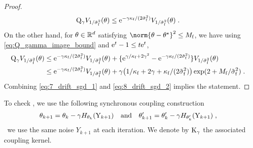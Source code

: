 \begin{proof}
\begin{equation}
{\rm Q}_{\gamma} V_{1/\tilde{\sigma}_{\mathrm{f}}^2}(\theta) \leq \mathrm{e}^{-\gamma\kappa_{\mathrm{f}}/(2\tilde{\sigma}_{\mathrm{f}}^2)} V_{1/\tilde{\sigma}_{\mathrm{f}}^2}(\theta) \;.
\end{equation}
On the other hand, for $\theta \in \mathbb{R}^d$ satisfying $\norm{\theta-\thetas}^2 \leq M_{\objf}$, we have using \eqref{eq:Q_gamma_image_bound} and $\mathrm{e}^t -1 \leq t \mathrm{e}^t$,
\begin{align}
\nonumber
{\rm Q}_{\gamma} V_{1/\tilde{\sigma}_{\mathrm{f}}^2}(\theta) &\leq \mathrm{e}^{-\gamma\kappa_{\mathrm{f}}/(2\tilde{\sigma}_{\mathrm{f}}^2)} V_{1/\tilde{\sigma}_{\mathrm{f}}^2}(\theta) + \{\mathrm{e}^{\gamma / \kappa_{\mathrm{f}} + 2 \gamma^2}-\mathrm{e}^{-\gamma\kappa_{\mathrm{f}}/(2\tilde{\sigma}_{\mathrm{f}}^2)}\}V_{1/\tilde{\sigma}_{\mathrm{f}}^2}(\theta) \\
\label{eq:8_drift_sgd_2}
& \leq \mathrm{e}^{-\gamma\kappa_{\mathrm{f}}/(2\tilde{\sigma}_{\mathrm{f}}^2)} V_{1/\tilde{\sigma}_{\mathrm{f}}^2}(\theta) + \gamma\bigl(1/\kappa_{\mathrm{f}} + 2 \gamma + \kappa_{\mathrm{f}}/(2\tilde{\sigma}_{\mathrm{f}}^2)\bigr) \exp(2 + M_{\mathrm{f}}/\tilde{\sigma}_{\mathrm{f}}^2) \;.
\end{align}
Combining \eqref{eq:7_drift_sgd_1} and \eqref{eq:8_drift_sgd_2} implies the statement.
\end{proof}

To check , we use the following synchronous coupling construction
\begin{equation*}
 \theta_{k+1} = \theta_k - \gamma  H_{\theta_k}(\mathrm{Y}_{k+1}) \quad \text{and}
 \quad  \theta'_{k+1} = \theta'_k - \gamma  H_{\theta_k'}(\mathrm{Y}_{k+1}) \;,
\end{equation*}
\ie\ we use the same noise $Y_{k+1}$ at each iteration. We denote by ${\rm K}_\gamma$ the associated coupling kernel.

